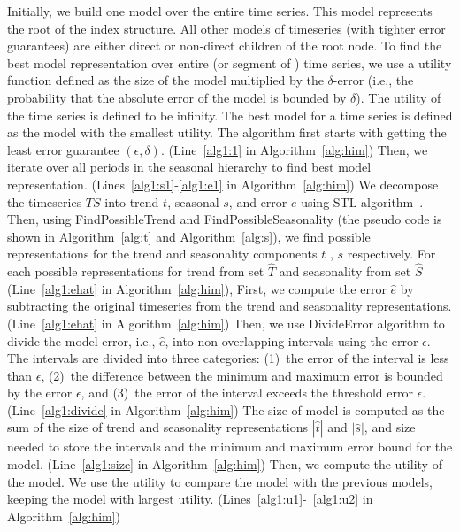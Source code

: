 \documentclass{sigmod}
\begin{document}
Initially, we build one model  over the entire time series. This model represents the root of the index structure. All other models of timeseries (with tighter error guarantees) are  either direct or non-direct children of the root node.
To find the best model representation over entire (or segment of ) time series, we use a utility function defined as the size of the model multiplied by the $\delta$-error  (i.e., the probability that the absolute error of the model is bounded by $\delta$). The utility of the time series is defined to be infinity. The best model for a time series is defined as the model with the smallest utility. 
The algorithm first starts with getting the least error guarantee $(\epsilon, \delta)$. (Line~\ref{alg1:1} in Algorithm~\ref{alg:him})
 Then, we iterate over all periods in the seasonal hierarchy to find best model representation. (Lines~\ref{alg1:s1}-\ref{alg1:e1} in Algorithm~\ref{alg:him})
We decompose the timeseries $TS$ into trend $t$, seasonal $s$, and error $e$ using STL algorithm~\cite{STL}. Then, using FindPossibleTrend and FindPossibleSeasonality (the pseudo code is shown in Algorithm~\ref{alg:t} and Algorithm~\ref{alg:s}), we find possible representations for the trend and seasonality components $t$ , $s$ respectively. 
For each possible representations for trend from  set $\hat{T}$ and seasonality from set $\hat{S}$ (Line~\ref{alg1:ehat} in Algorithm~\ref{alg:him}), First, we compute the error $\hat{e}$ by subtracting the original timeseries from the trend and seasonality representations. (Line~\ref{alg1:ehat} in Algorithm~\ref{alg:him}) Then, we use DivideError algorithm to divide the model error, i.e., $\hat{e}$, into non-overlapping intervals using the error $\epsilon$. The intervals are divided into three categories: (1)~the error of the interval is less than $\epsilon$, (2)~the difference between the minimum and maximum error is bounded by the error $\epsilon$, and (3)~the error of the interval exceeds the threshold error $\epsilon$. (Line~\ref{alg1:divide} in Algorithm~\ref{alg:him}) 
The size of model is computed as the sum of the size of trend and seasonality representations $|\hat{t}|$ and $|\hat{s}|$, and size needed to store the intervals and the minimum and maximum error bound for the model.
(Line~\ref{alg1:size} in Algorithm~\ref{alg:him}) Then, we compute the utility of the model. We use the utility to compare the model with the previous models, keeping the model with largest utility. (Lines~\ref{alg1:u1}-~\ref{alg1:u2} in Algorithm~\ref{alg:him}) 
\end{document}
